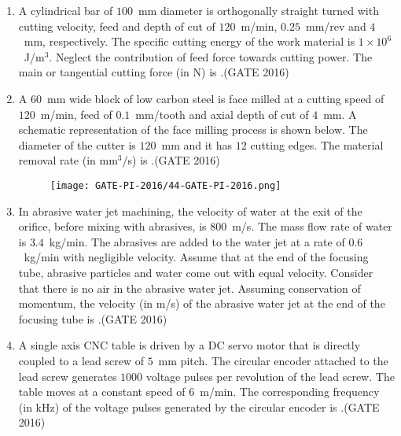\documentclass[journal,12pt,onecolumn]{IEEEtran}
\theoremstyle{remark}
\begin{document}
\begin{enumerate}
\item A cylindrical bar of $100$~mm diameter is orthogonally straight turned with cutting velocity, feed and depth of cut of $120$~m/min, $0.25$~mm/rev and $4$~mm, respectively. The specific cutting energy of the work material is $1 \times 10^6$~J/m$^3$. Neglect the contribution of feed force towards cutting power. The main or tangential cutting force (in N) is \underline{\hspace{2cm}}.\hfill{(GATE 2016)}
\vspace{0.5cm}
\newpage
\item A $60$~mm wide block of low carbon steel is face milled at a cutting speed of $120$~m/min, feed of $0.1$~mm/tooth and axial depth of cut of $4$~mm. A schematic representation of the face milling process is shown below. The diameter of the cutter is $120$~mm and it has $12$ cutting edges. The material removal rate (in mm$^3$/s) is \underline{\hspace{2cm}}.\hfill{(GATE 2016)}
\begin{figure}[h!]
    \centering
    \texttt{[image: GATE-PI-2016/44-GATE-PI-2016.png]}
    \caption{}
    \label{q44}
\end{figure}
\vspace{0.5cm}

\item In abrasive water jet machining, the velocity of water at the exit of the orifice, before mixing with abrasives, is $800$~m/s. The mass flow rate of water is $3.4$~kg/min. The abrasives are added to the water jet at a rate of $0.6$~kg/min with negligible velocity. Assume that at the end of the focusing tube, abrasive particles and water come out with equal velocity. Consider that there is no air in the abrasive water jet. Assuming conservation of momentum, the velocity (in m/s) of the abrasive water jet at the end of the focusing tube is \underline{\hspace{2cm}}.\hfill{(GATE 2016)}
\vspace{0.5cm}

\item A single axis CNC table is driven by a DC servo motor that is directly coupled to a lead screw of $5$~mm pitch. The circular encoder attached to the lead screw generates $1000$ voltage pulses per revolution of the lead screw. The table moves at a constant speed of $6$~m/min. The corresponding frequency (in kHz) of the voltage pulses generated by the circular encoder is \underline{\hspace{2cm}}.\hfill{(GATE 2016)}
\vspace{0.5cm}


\end{enumerate}
\end{document}
